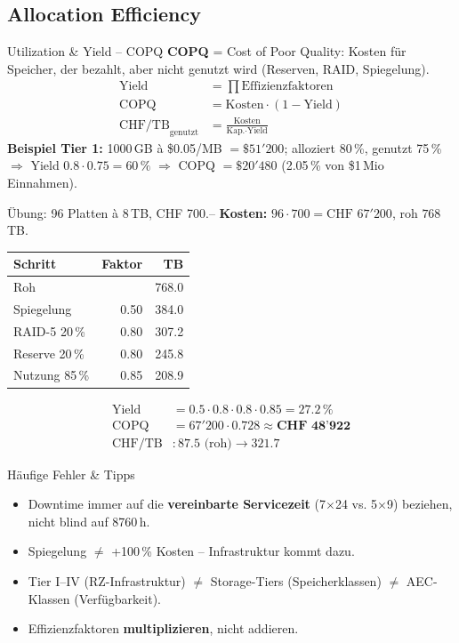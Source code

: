 \documentclass[a4paper, fontsize=7pt]{scrartcl}
\renewcommand*{\arraystretch}{1.5}  %
\begin{document}
\subsection{Allocation Efficiency}

\begin{mainbox}{Utilization \& Yield -- COPQ}
\textbf{COPQ} = Cost of Poor Quality: Kosten für Speicher, der bezahlt, aber
nicht genutzt wird (Reserven, RAID, Spiegelung).
\begin{align*}
\text{Yield} &= \prod \text{Effizienzfaktoren} \\
\text{COPQ} &= \text{Kosten} \cdot (1 - \text{Yield}) \\
\text{CHF/TB}_{\text{genutzt}} &= \frac{\text{Kosten}}{\text{Kap.} \cdot \text{Yield}}
\end{align*}
\textbf{Beispiel Tier 1:} 1000\,GB à \$0.05/MB $= \$51'200$;
alloziert 80\,\%, genutzt 75\,\% $\Rightarrow$ Yield $0.8 \cdot 0.75 = 60\,\%$
$\Rightarrow$ COPQ $= \$20'480$ (2.05\,\% von \$1\,Mio Einnahmen).
\end{mainbox}

\begin{subbox}{Übung: 96 Platten à 8\,TB, CHF 700.--}
\textbf{Kosten:} $96 \cdot 700 = \text{CHF } 67'200$, roh $768$\,TB.
\renewcommand*{\arraystretch}{1.15}
\begin{center}
\begin{tabular}{l|r|r}
\textbf{Schritt} & \textbf{Faktor} & \textbf{TB} \\
\hline
Roh & & 768.0 \\
Spiegelung & 0.50 & 384.0 \\
RAID-5 20\,\% & 0.80 & 307.2 \\
Reserve 20\,\% & 0.80 & 245.8 \\
Nutzung 85\,\% & 0.85 & 208.9 \\
\end{tabular}
\end{center}
\begin{align*}
\text{Yield} &= 0.5 \cdot 0.8 \cdot 0.8 \cdot 0.85 = 27.2\,\% \\
\text{COPQ} &= 67'200 \cdot 0.728 \approx \textbf{CHF 48'922} \\
\text{CHF/TB} &: 87.5 \text{ (roh)} \to 321.7
\end{align*}
\end{subbox}

\begin{subbox}{Häufige Fehler \& Tipps}
\begin{itemize}
    \item Downtime immer auf die \textbf{vereinbarte Servicezeit} (7$\times$24
          vs. 5$\times$9) beziehen, nicht blind auf 8760\,h.
    \item Spiegelung $\neq$ +100\,\% Kosten -- Infrastruktur kommt dazu.
    \item Tier I--IV (RZ-Infrastruktur) $\neq$ Storage-Tiers (Speicherklassen)
          $\neq$ AEC-Klassen (Verfügbarkeit).
    \item Effizienzfaktoren \textbf{multiplizieren}, nicht addieren.
\end{itemize}
\end{subbox}
\end{document}
